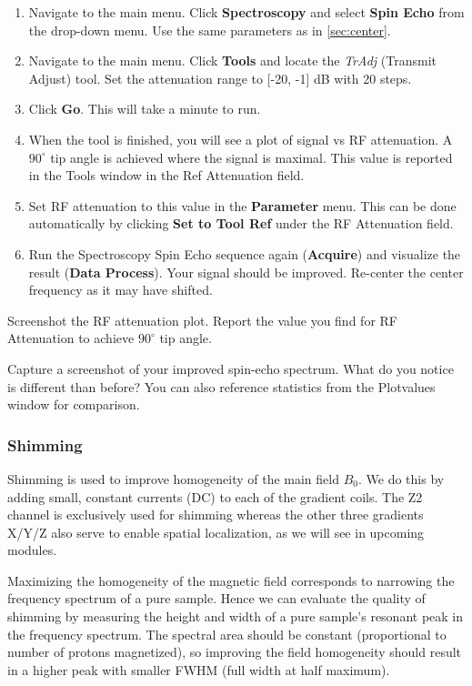 \begin{enumerate}
  \item Navigate to the main menu. Click \textbf{Spectroscopy} and select \textbf{Spin Echo} from the drop-down menu. Use the same parameters as in \ref{sec:center}.
  \item Navigate to the main menu. Click \textbf{Tools} and locate the \emph{TrAdj} (Transmit Adjust) tool. Set the attenuation range to [-20, -1] dB with 20 steps. 
  \item Click \textbf{Go}. This will take a minute to run.
  \item When the tool is finished, you will see a plot of signal vs RF attenuation. A $90^{\circ}$ tip angle is achieved where the signal is maximal. This value is reported in the Tools window in the Ref Attenuation field.
  \item Set RF attenuation to this value in the \textbf{Parameter} menu. This can be done automatically by clicking \textbf{Set to Tool Ref} under the RF Attenuation field. 
  \item Run the Spectroscopy Spin Echo sequence again (\textbf{Acquire}) and visualize the result (\textbf{Data Process}). Your signal should be improved. Re-center the center frequency as it may have shifted.  
\end{enumerate}

\noindent{}\color{red}Screenshot the RF attenuation plot. Report the value you find for RF Attenuation to achieve $90^{\circ}$ tip angle.
\vspace{5mm}

\noindent{}\color{red}Capture a screenshot of your improved spin-echo spectrum. What do you notice is different than before? You can also reference statistics from the Plotvalues window for comparison.
\color{black}

\subsubsection{Shimming} 

\noindent{}Shimming is used to improve homogeneity of the main field $B_0$. We do this by adding small, constant currents (DC) to each of the gradient coils. The Z2 channel is exclusively used for shimming whereas the other three gradients X/Y/Z also serve to enable spatial localization, as we will see in upcoming modules.

\vspace{5mm}

\noindent{} Maximizing the homogeneity of the magnetic field corresponds to narrowing the frequency spectrum of a pure sample. Hence we can evaluate the quality of shimming by measuring the height and width of a pure sample's resonant peak in the frequency spectrum. The spectral area should be constant (proportional to number of protons magnetized), so improving the field homogeneity should result in a higher peak with smaller FWHM (full width at half maximum).

